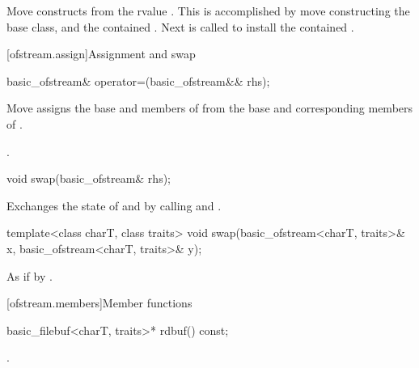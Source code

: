 \begin{itemdescr}
\pnum
\effects Move constructs from the rvalue . This
is accomplished by move constructing the base class, and the contained
. Next
is called to install
the contained .
\end{itemdescr}

[ofstream.assign]{Assignment and swap}

%
\begin{itemdecl}
basic_ofstream& operator=(basic_ofstream&& rhs);
\end{itemdecl}

\begin{itemdescr}
\pnum
\effects Move assigns the base and members of  from the base and corresponding
members of .

\pnum
\returns {}.
\end{itemdescr}

%
\begin{itemdecl}
void swap(basic_ofstream& rhs);
\end{itemdecl}

\begin{itemdescr}
\pnum
\effects Exchanges the state of 
and  by calling
 and
.
\end{itemdescr}

%
\begin{itemdecl}
template<class charT, class traits>
  void swap(basic_ofstream<charT, traits>& x,
            basic_ofstream<charT, traits>& y);
\end{itemdecl}

\begin{itemdescr}
\pnum
\effects As if by .
\end{itemdescr}

[ofstream.members]{Member functions}

%
\begin{itemdecl}
basic_filebuf<charT, traits>* rdbuf() const;
\end{itemdecl}

\begin{itemdescr}
\pnum
\returns
{}.
\end{itemdescr}

